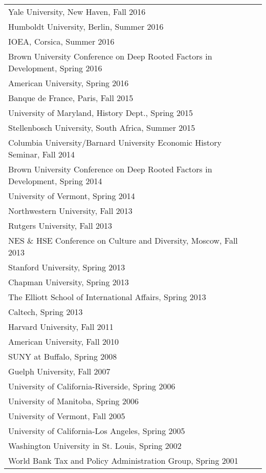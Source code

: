 \documentclass[11pt,fullpage]{article}
\begin{document}
\begin{longtable}{ll}
	Yale University, New Haven, Fall 2016\\
	Humboldt University, Berlin, Summer 2016\\
	IOEA, Corsica, Summer 2016\\
	Brown University Conference on Deep Rooted Factors in Development, Spring 2016 \\
	American University, Spring 2016 \\
	Banque de France, Paris, Fall 2015 \\
	University of Maryland, History Dept., Spring 2015 \\
	Stellenbosch University, South Africa, Summer 2015 \\
	Columbia University/Barnard University Economic History Seminar, Fall 2014\\
	Brown University Conference on Deep Rooted Factors in Development, Spring 2014\\
	University of Vermont, Spring 2014\\
	Northwestern University, Fall 2013 \\
	Rutgers University, Fall 2013 \\
	NES \& HSE Conference on Culture and Diversity, Moscow, Fall 2013 \\
	Stanford University, Spring 2013 \\
	Chapman University, Spring 2013 \\
	The Elliott School of International Affairs, Spring 2013 \\
	Caltech, Spring 2013 \\
	Harvard University, Fall 2011 \\
	American University, Fall 2010 \\
	SUNY at Buffalo, Spring 2008 \\
	Guelph University, Fall 2007 \\
	University of California-Riverside, Spring 2006 \\
	University of Manitoba, Spring 2006 \\
	University of Vermont, Fall 2005 \\
	University of California-Los Angeles, Spring 2005 \\
	Washington University in St. Louis, Spring 2002 \\
	World Bank Tax and Policy Administration Group, Spring 2001 \\
\end{longtable}

\end{document}
